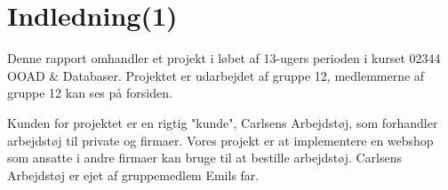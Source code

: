 \chapter{Indledning(1)}

Denne rapport omhandler et projekt i løbet af 13-ugers perioden i kurset 02344 OOAD \& Databaser. Projektet er udarbejdet af gruppe 12, medlemmerne af gruppe 12 kan ses på forsiden.

Kunden for projektet er en rigtig "kunde", Carlsens Arbejdstøj, som forhandler arbejdstøj til private og firmaer. Vores projekt er at implementere en webshop som ansatte i andre firmaer kan bruge til at bestille arbejdstøj. Carlsens Arbejdstøj er ejet af gruppemedlem Emils far.


